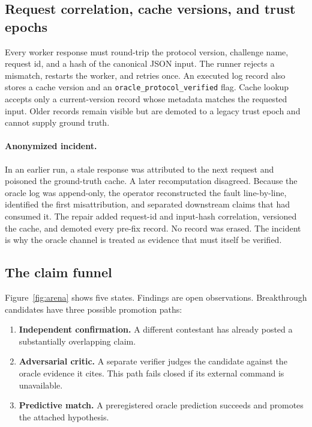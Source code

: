 \documentclass[11pt]{article}
\newcommand{\code}[1]{\texttt{#1}}
\begin{document}
\subsection{Request correlation, cache versions, and trust epochs}

Every worker response must round-trip the protocol version, challenge name,
request id, and a hash of the canonical JSON input.  The runner rejects a
mismatch, restarts the worker, and retries once.  An executed log record also
stores a cache version and an \code{oracle\_protocol\_verified} flag.  Cache
lookup accepts only a current-version record whose metadata matches the
requested input.  Older records remain visible but are demoted to a legacy
trust epoch and cannot supply ground truth.

\paragraph{Anonymized incident.}
In an earlier run, a stale response was attributed to the next request and
poisoned the ground-truth cache.  A later recomputation disagreed.  Because
the oracle log was append-only, the operator reconstructed the fault
line-by-line, identified the first misattribution, and separated downstream
claims that had consumed it.  The repair added request-id and input-hash
correlation, versioned the cache, and demoted every pre-fix record.  No record
was erased.  The incident is why the oracle channel is treated as evidence
that must itself be verified.

\subsection{The claim funnel}

Figure~\ref{fig:arena} shows five states.  Findings are open observations.
Breakthrough candidates have three possible promotion paths:

\begin{enumerate}[leftmargin=*,itemsep=0.2em]
\item \textbf{Independent confirmation.}  A different contestant has already
posted a substantially overlapping claim.
\item \textbf{Adversarial critic.}  A separate verifier judges the candidate
against the oracle evidence it cites.  This path fails closed if its external
command is unavailable.
\item \textbf{Predictive match.}  A preregistered oracle prediction succeeds
and promotes the attached hypothesis.
\end{enumerate}
\end{document}
